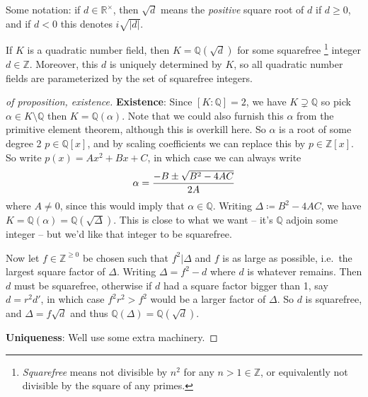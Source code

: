 \begin{remark}

Some notation: if \(d\in {\mathbb{R}}^{\times}\), then \(\sqrt d\) means
the \emph{positive} square root of \(d\) if \(d \geq 0\), and if \(d<0\)
this denotes \(i\sqrt{{\left\lvert {d} \right\rvert}}\).

\end{remark}

\begin{proposition}

If \(K\) is a quadratic number field, then
\(K = {\mathbb{Q}}(\sqrt{d})\) for some squarefree \footnote{\emph{Squarefree}
  means not divisible by \(n^2\) for any \(n > 1\in {\mathbb{Z}}\), or
  equivalently not divisible by the square of any primes.} integer
\(d\in {\mathbb{Z}}\). Moreover, this \(d\) is uniquely determined by
\(K\), so all quadratic number fields are parameterized by the set of
squarefree integers.

\end{proposition}

\begin{proof}[of proposition, existence]

\textbf{Existence}: Since \([K: {\mathbb{Q}}] = 2\), we have
\(K\supsetneq {\mathbb{Q}}\) so pick
\(\alpha\in K\setminus{\mathbb{Q}}\) then \(K = {\mathbb{Q}}(\alpha)\).
Note that we could also furnish this \(\alpha\) from the primitive
element theorem, although this is overkill here. So \(\alpha\) is a root
of some degree 2 \(p\in {\mathbb{Q}}[x]\), and by scaling coefficients
we can replace this by \(p\in {\mathbb{Z}}[x]\). So write
\(p(x) = Ax^2 + Bx + C\), in which case we can always write
\begin{align*}
\alpha = {-B \pm \sqrt{B^2 - 4AC} \over 2A} 
\end{align*}
where \(A\neq 0\), since this would imply that
\(\alpha\in{\mathbb{Q}}\). Writing \(\Delta\coloneqq B^2 - 4AC\), we
have \(K = {\mathbb{Q}}(\alpha) = {\mathbb{Q}}(\sqrt{\Delta})\). This is
close to what we want -- it's \({\mathbb{Q}}\) adjoin some integer --
but we'd like that integer to be squarefree.

\hfill\break

Now let \(f\in {\mathbb{Z}}^{\geq 0}\) be chosen such that
\(f^2 \mathrel{\Big|}\Delta\) and \(f\) is as large as possible,
i.e.~the largest square factor of \(\Delta\). Writing
\(\Delta = f^2 - d\) where \(d\) is whatever remains. Then \(d\) must be
squarefree, otherwise if \(d\) had a square factor bigger than 1, say
\(d = r^2 d'\), in which case \(f^2 r^2 > f^2\) would be a larger factor
of \(\Delta\). So \(d\) is squarefree, and \(\Delta = f \sqrt d\) and
thus \({\mathbb{Q}}(\Delta) = {\mathbb{Q}}(\sqrt{d})\).

\textbf{Uniqueness}: Well use some extra machinery.

\end{proof}

